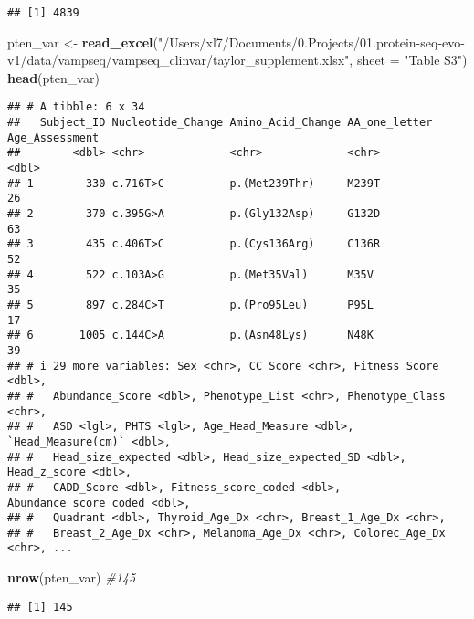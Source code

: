 \documentclass[
]{article}
\newenvironment{Shaded}{\begin{snugshade}}{\end{snugshade}}
\newcommand{\AttributeTok}[1]{\textcolor[rgb]{0.13,0.29,0.53}{#1}}
\newcommand{\CommentTok}[1]{\textcolor[rgb]{0.56,0.35,0.01}{\textit{#1}}}
\newcommand{\FunctionTok}[1]{\textcolor[rgb]{0.13,0.29,0.53}{\textbf{#1}}}
\newcommand{\NormalTok}[1]{#1}
\newcommand{\OtherTok}[1]{\textcolor[rgb]{0.56,0.35,0.01}{#1}}
\newcommand{\StringTok}[1]{\textcolor[rgb]{0.31,0.60,0.02}{#1}}
\begin{document}
\begin{verbatim}
## [1] 4839
\end{verbatim}

\begin{Shaded}
\begin{Highlighting}[]
\NormalTok{pten\_var }\OtherTok{\textless{}{-}} \FunctionTok{read\_excel}\NormalTok{(}\StringTok{"/Users/xl7/Documents/0.Projects/01.protein{-}seq{-}evo{-}v1/data/vampseq/vampseq\_clinvar/taylor\_supplement.xlsx"}\NormalTok{, }\AttributeTok{sheet =} \StringTok{"Table S3"}\NormalTok{)}
\FunctionTok{head}\NormalTok{(pten\_var)}
\end{Highlighting}
\end{Shaded}

\begin{verbatim}
## # A tibble: 6 x 34
##   Subject_ID Nucleotide_Change Amino_Acid_Change AA_one_letter Age_Assessment
##        <dbl> <chr>             <chr>             <chr>                  <dbl>
## 1        330 c.716T>C          p.(Met239Thr)     M239T                     26
## 2        370 c.395G>A          p.(Gly132Asp)     G132D                     63
## 3        435 c.406T>C          p.(Cys136Arg)     C136R                     52
## 4        522 c.103A>G          p.(Met35Val)      M35V                      35
## 5        897 c.284C>T          p.(Pro95Leu)      P95L                      17
## 6       1005 c.144C>A          p.(Asn48Lys)      N48K                      39
## # i 29 more variables: Sex <chr>, CC_Score <chr>, Fitness_Score <dbl>,
## #   Abundance_Score <dbl>, Phenotype_List <chr>, Phenotype_Class <chr>,
## #   ASD <lgl>, PHTS <lgl>, Age_Head_Measure <dbl>, `Head_Measure(cm)` <dbl>,
## #   Head_size_expected <dbl>, Head_size_expected_SD <dbl>, Head_z_score <dbl>,
## #   CADD_Score <dbl>, Fitness_score_coded <dbl>, Abundance_score_coded <dbl>,
## #   Quadrant <dbl>, Thyroid_Age_Dx <chr>, Breast_1_Age_Dx <chr>,
## #   Breast_2_Age_Dx <chr>, Melanoma_Age_Dx <chr>, Colorec_Age_Dx <chr>, ...
\end{verbatim}

\begin{Shaded}
\begin{Highlighting}[]
\FunctionTok{nrow}\NormalTok{(pten\_var) }\CommentTok{\#145}
\end{Highlighting}
\end{Shaded}

\begin{verbatim}
## [1] 145
\end{verbatim}
\end{document}
